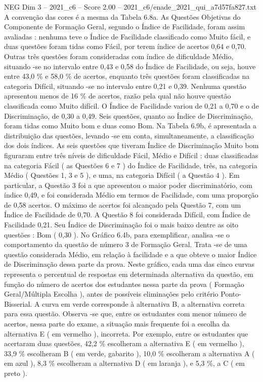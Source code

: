 \begin{textsample}{NEG Dim 3 – 2021\_c6 – Score 2.00 – 2021\_c6/enade\_2021\_qui\_a7d57fa827.txt}
A convenção das cores é a mesma da Tabela 6.8a.
As Questões Objetivas do Componente de Formação Geral, segundo o Índice de Facilidade, foram assim avaliadas : nenhuma teve o Índice de Facilidade classificado como Muito fácil, e duas questões foram tidas como Fácil, por terem índice de acertos 0,64 e 0,70.
Outras três questões foram consideradas com índice de dificuldade Médio, situando -se no intervalo entre 0,43 e 0,58 do Índice de Facilidade, ou seja, houve entre 43,0 \% e 58,0 \% de acertos, enquanto três questões foram classificadas na categoria Difícil, situando -se no intervalo entre 0,21 e 0,39.
Nenhuma questão apresentou menos de 16 \% de acertos, razão pela qual não houve questão classificada como Muito difícil.
O Índice de Facilidade variou de 0,21 a 0,70 e o de Discriminação, de 0,30 a 0,49.
Seis questões, quanto ao Índice de Discriminação, foram tidas como Muito bom e duas como Bom.
Na Tabela 6.9b, é apresentada a distribuição das questões, levando -se em conta, simultaneamente, a classificação dos dois índices.
As seis questões que tiveram Índice de Discriminação Muito bom figuraram entre três níveis de dificuldade Fácil, Médio e Difícil : duas classificadas na categoria Fácil ( as Questões 6 e 7 ) do Índice de Facilidade, três, na categoria Médio ( Questões 1, 3 e 5 ), e uma, na categoria Difícil ( a Questão 4 ).
Em particular, a Questão 3 foi a que apresentou o maior poder discriminatório, com índice 0,49, e foi considerada Médio em termos de Facilidade, com uma proporção de 0,58 acertos.
O máximo de acertos foi alcançado pela Questão 7, com um Índice de Facilidade de 0,70.
A Questão 8 foi considerada Difícil, com Índice de Facilidade 0,21.
Seu Índice de Discriminação foi o mais baixo dentre as oito questões : Bom ( 0,30 ).
No Gráfico 6.4b, para exemplificar, analisa -se o comportamento da questão de número 3 de Formação Geral.
Trata -se de uma questão considerada Médio, em relação à facilidade e a que obteve o maior Índice de Discriminação dessa parte da prova.
Neste gráfico, cada uma das cinco curvas representa o percentual de respostas em determinada alternativa da questão, em função do número de acertos dos estudantes nessa parte da prova ( Formação Geral/Múltipla Escolha ), antes de possíveis eliminações pelo critério Ponto-Bisserial.
A curva em verde corresponde à alternativa B, a alternativa correta para essa questão.
Observa -se que, entre os estudantes com menor número de acertos, nessa parte do exame, a situação mais frequente foi a escolha da alternativa E ( em vermelho ), incorreta.
Por exemplo, entre os estudantes que acertaram duas questões, 42,2 \% escolheram a alternativa E ( em vermelho ), 33,9 \% escolheram B ( em verde, gabarito ), 10,0 \% escolheram a alternativa A ( em azul ), 8,3 \% escolheram a alternativa D ( em laranja ), e 5,3 \%, a C ( em preto ).

\end{textsample}

